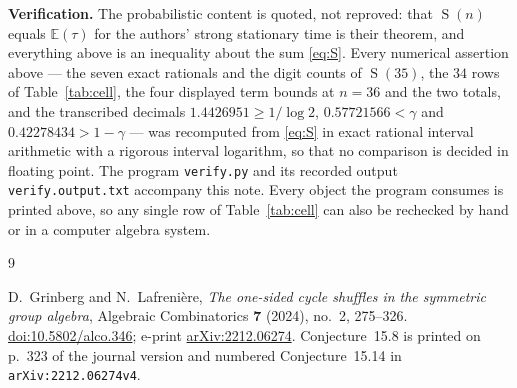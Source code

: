 \documentclass[11pt]{amsart}
\DeclareMathOperator{\Sfun}{S}
\begin{document}
\medskip
\noindent\textbf{Verification.}
The probabilistic content is quoted, not reproved: that $\Sfun(n)$ equals
$\mathbb E(\tau)$ for the authors' strong stationary time is their theorem, and everything
above is an inequality about the sum \eqref{eq:S}. Every numerical assertion above --- the
seven exact rationals and the digit counts of $\Sfun(35)$, the $34$ rows of
Table~\ref{tab:cell}, the four displayed term bounds at $n=36$ and the two totals, and the
transcribed decimals $1.4426951\ge1/\log2$, $0.57721566<\gamma$ and
$0.42278434>1-\gamma$ --- was recomputed from \eqref{eq:S} in exact rational interval
arithmetic with a rigorous interval logarithm, so that no comparison is decided in floating
point. The program \texttt{verify.py} and its recorded output \texttt{verify.output.txt}
accompany this note. Every object the program consumes is printed above, so any single row
of Table~\ref{tab:cell} can also be rechecked by hand or in a computer algebra system.

\begin{thebibliography}{9}

D.~Grinberg and N.~Lafreni\`ere,
\emph{The one-sided cycle shuffles in the symmetric group algebra},
Algebraic Combinatorics \textbf{7} (2024), no.~2, 275--326.
\href{https://doi.org/10.5802/alco.346}{doi:10.5802/alco.346};
e-print \href{https://arxiv.org/abs/2212.06274}{arXiv:2212.06274}.
Conjecture~15.8 is printed on p.~323 of the journal version and numbered
Conjecture~15.14 in \texttt{arXiv:2212.06274v4}.

\end{thebibliography}
\end{document}
